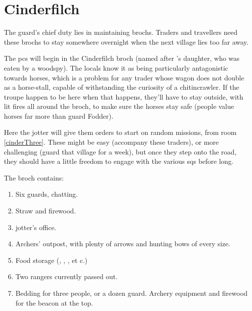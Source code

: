 \section{Cinderfilch }



\begin{multicols}{2}

\noindent
The \gls{guard}'s chief duty lies in maintaining \glspl{broch}.
Traders and travellers need these \glspl{broch} to stay somewhere overnight when the next \gls{village} lies too far away.

The \glspl{pc} will begin in the Cinderfilch \gls{broch} (named after 's daughter, who was eaten by a woodspy).
The locals know it as being particularly antagonistic towards horses, which is a problem for any trader whose wagon does not double as a horse-stall, capable of withstanding the curiosity of a chitincrawler.
If the troupe happen to be here when that happens, they'll have to stay outside, with lit fires all around the \gls{broch}, to make sure the horses stay safe (people value horses far more than \gls{guard} Fodder).

Here the \gls{jotter} will give them orders to start on random missions, from room \ref{cinderThree}.%
These might be easy (accompany these traders), or more challenging (guard that \gls{village} for a week), but once they step onto the road, they should have a little freedom to engage with the various \glspl{sq} before long.

The \gls{broch} contains:

\begin{enumerate}
  \item
  Six \glspl{guard}, chatting.
  \label{cinderOne}
  \item
  Straw and firewood.
  \label{cinderTwo}
  \item
  \Gls{jotter}'s office.
  \label{cinderThree}
  \item
  Archers' outpost, with plenty of arrows and hunting bows of every size.
  \label{cinderFour}
  \item
  Food storage (\rations, \rations, \rations, et c.)
  \label{cinderFiveSide}
  \item
  Two \glspl{ranger} currently passed out.
  \label{cinderFive}
  \item
  Bedding for three people, or a dozen \gls{guard}.
  Archery equipment and firewood for the beacon at the top.
  \label{cinderSix}
\end{enumerate}

\end{multicols}
